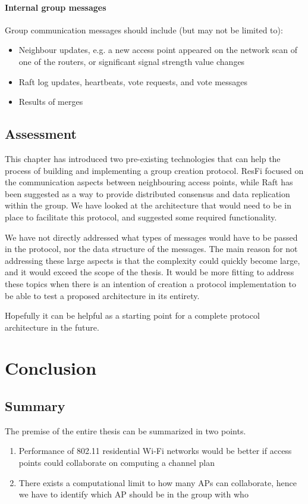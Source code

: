 \subsubsection{Internal group messages}
Group communication messages should include (but may not be limited to):
			\begin{itemize}
				\item Neighbour updates, e.g. a new access point appeared on the network scan of one of the routers, or significant signal strength value changes
				\item Raft log updates, heartbeats, vote requests, and vote messages
				\item Results of merges 
			\end{itemize}
				
\section{Assessment}
This chapter has introduced two pre-existing technologies that can help the process of building and implementing a group creation protocol. ResFi focused on the communication aspects between
neighbouring access points, while Raft has been suggested as a way to provide distributed consensus and data replication within the group. We have looked at the architecture that
would need to be in place to facilitate this protocol, and suggested some required functionality. 

We have not directly addressed what types of messages would have to be passed in the protocol, nor the data structure of the messages. The main reason for not addressing these large aspects is 
that the complexity could quickly become large, and it would exceed the scope of the thesis. It would be more fitting to address these topics when there is an intention of creation
a protocol implementation to be able to test a proposed architecture in its entirety.  

Hopefully it can be helpful as a starting point for a complete protocol architecture in the future. 

\chapter{Conclusion}

\section{Summary}
The premise of the entire thesis can be summarized in two points. 
\begin{enumerate}
	\item Performance of 802.11 residential Wi-Fi networks would be better if access points could collaborate on computing a channel plan
	\item There exists a computational limit to how many APs can collaborate, hence we have to identify which AP should be in the group with who
\end{enumerate}

